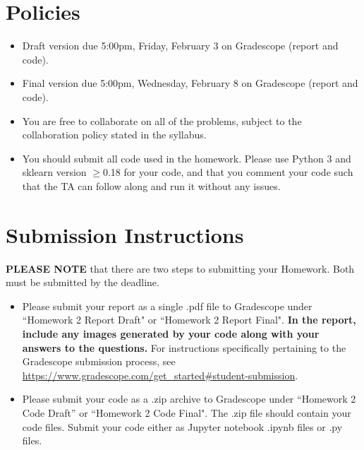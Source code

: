 \newif\ifshowsolutions
\showsolutionsfalse




\pagestyle{fancy}

\section*{Policies}

\begin{itemize}
	\item Draft version due 5:00pm, Friday, February 3 on Gradescope (report and code).
	\item Final version due 5:00pm, Wednesday, February 8 on Gradescope (report and code).
	\item You are free to collaborate on all of the problems, subject to the collaboration policy stated in the syllabus.
	\item You should submit all code used in the homework.
	      Please use Python 3 and sklearn version $\geq$0.18 for your code, and that you comment your code such that the TA can follow along and run it without any issues.
\end{itemize}

\section*{Submission Instructions}
\textbf{PLEASE NOTE} that there are two steps to submitting your Homework.
Both must be submitted by the deadline.

\begin{itemize}
	\item Please submit your report as a single .pdf file to Gradescope under ``Homework 2 Report Draft" or ``Homework 2 Report Final".
	      \textbf{In the report, include any images generated by your code along with your answers to the questions.}
	      For instructions specifically pertaining to the Gradescope submission process, see \url{https://www.gradescope.com/get_started#student-submission}.
	\item Please submit your code as a .zip archive to Gradescope under ``Homework 2 Code Draft'' or ``Homework 2 Code Final".
	      The .zip file should contain your code files.
	      Submit your code either as Jupyter notebook .ipynb files or .py files.
\end{itemize}

